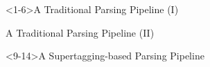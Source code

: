 \documentclass[slides]{subfiles}
\begin{document}
    \begin{frame}<1-6>{A Traditional Parsing Pipeline (I)}
        \resizebox{\linewidth}{!}{}
    \end{frame}

    \begin{frame}{A Traditional Parsing Pipeline (II)}
        \centering
        
    \end{frame}

    \begin{frame}<9-14>{A Supertagging-based Parsing Pipeline \citep{bangalore1999supertagging}}
        \resizebox{\linewidth}{!}{}
    \end{frame}
\end{document}
